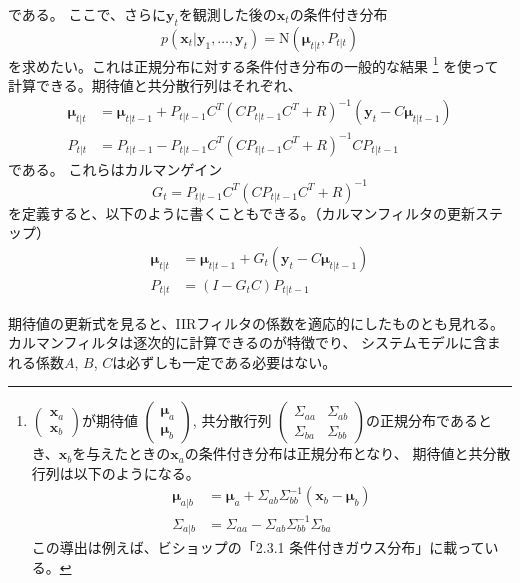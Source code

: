 \documentclass[textwidth-limit=45]{bxjsarticle}
\begin{document}
である。
ここで、さらに$\bm y_t$を観測した後の$\bm x_t$の条件付き分布
\begin{equation}
  p(\bm x_{t}|\bm y_1, \dots, \bm y_{t}) = \mathrm N(\bm \mu_{t|t}, P_{t|t})
\end{equation}
を求めたい。これは正規分布に対する条件付き分布の一般的な結果
\footnote{
  $\begin{pmatrix}
    \bm x_{a} \\
    \bm x_{b}
  \end{pmatrix}
  $が期待値
  $\begin{pmatrix}
    \bm \mu_{a} \\
    \bm \mu_{b}
  \end{pmatrix}
  $, 共分散行列
  $\begin{pmatrix}
    \Sigma_{aa} & \Sigma_{ab} \\
    \Sigma_{ba} & \Sigma_{bb}
  \end{pmatrix}
  $の正規分布であるとき、$\bm x_b$を与えたときの$\bm x_a$の条件付き分布は正規分布となり、
  期待値と共分散行列は以下のようになる。
  \begin{align}
    \bm \mu_{a|b} &= \bm \mu_{a} + \Sigma_{ab} \Sigma_{bb}^{-1} (\bm x_b - \bm \mu_{b}) \\
    \Sigma_{a|b} &= \Sigma_{aa} - \Sigma_{ab} \Sigma_{bb}^{-1} \Sigma_{ba}
  \end{align}
  この導出は例えば、ビショップの「2.3.1 条件付きガウス分布」に載っている。
}
を使って計算できる。期待値と共分散行列はそれぞれ、
\begin{align}
  \bm \mu_{t|t} &= \bm \mu_{t|t-1} + P_{t|t-1}C^T (C P_{t|t-1} C^T + R)^{-1} (\bm y_t - C\bm \mu_{t|t-1})  \\
  P_{t|t} &= P_{t|t-1} - P_{t|t-1} C^T (C P_{t|t-1} C^T + R)^{-1} C P_{t|t-1}
\end{align}
である。
これらはカルマンゲイン
\begin{equation}
  G_t = P_{t|t-1} C^T (C P_{t|t-1} C^T + R)^{-1}
\end{equation}
を定義すると、以下のように書くこともできる。（カルマンフィルタの更新ステップ）
\begin{align}
  \bm \mu_{t|t} &= \bm \mu_{t|t-1} + G_t (\bm y_t - C\bm \mu_{t|t-1})  \\
  P_{t|t} &= (I- G_t C) P_{t|t-1}
\end{align}

期待値の更新式を見ると、IIRフィルタの係数を適応的にしたものとも見れる。
カルマンフィルタは逐次的に計算できるのが特徴でり、
システムモデルに含まれる係数$A$, $B$, $C$は必ずしも一定である必要はない。
\end{document}
